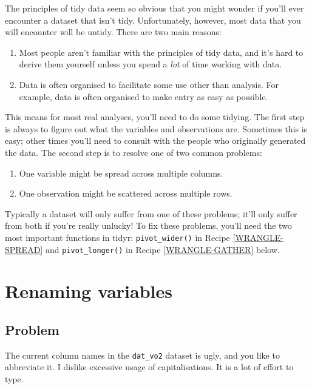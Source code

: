 \documentclass[
]{book}
\begin{document}
The principles of tidy data seem so obvious that you might wonder if you'll ever encounter a dataset that isn't tidy. Unfortunately, however, most data that you will encounter will be untidy. There are two main reasons:

\begin{enumerate}
\def\labelenumi{\arabic{enumi}.}
\item
  Most people aren't familiar with the principles of tidy data, and it's hard
  to derive them yourself unless you spend a \emph{lot} of time working with data.
\item
  Data is often organised to facilitate some use other than analysis. For
  example, data is often organised to make entry as easy as possible.
\end{enumerate}

This means for most real analyses, you'll need to do some tidying. The first step is always to figure out what the variables and observations are. Sometimes this is easy; other times you'll need to consult with the people who originally generated the data.
The second step is to resolve one of two common problems:

\begin{enumerate}
\def\labelenumi{\arabic{enumi}.}
\item
  One variable might be spread across multiple columns.
\item
  One observation might be scattered across multiple rows.
\end{enumerate}

Typically a dataset will only suffer from one of these problems; it'll only suffer from both if you're really unlucky! To fix these problems, you'll need the two most important functions in tidyr: \texttt{pivot\_wider()} in Recipe \ref{WRANGLE-SPREAD} and \texttt{pivot\_longer()} in Recipe \ref{WRANGLE-GATHER} below.

\hypertarget{WRANGLE-RENAME-VARIABLES}{%
\section{Renaming variables}\label{WRANGLE-RENAME-VARIABLES}}

\hypertarget{problem}{%
\subsection{Problem}\label{problem}}

The current column names in the \texttt{dat\_vo2} dataset is ugly, and you like to abbreviate it. I dislike excessive usage of capitalisations. It is a lot of effort to type.
\end{document}
